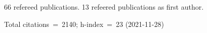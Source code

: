 66 refereed publications. 13 refeered publications as first author.

Total citations~=~2140; h-index~=~23 (2021-11-28)